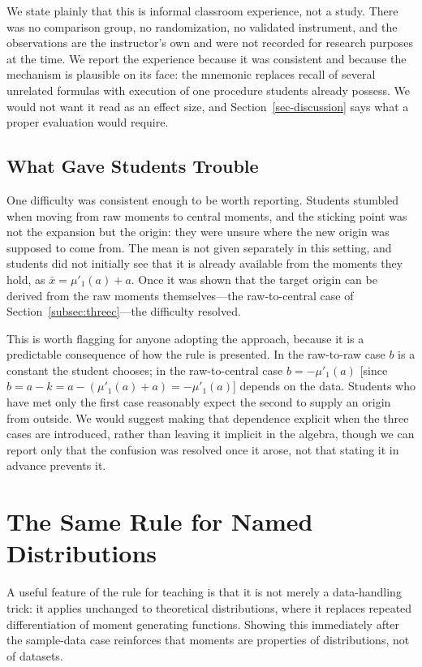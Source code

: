 \documentclass[
  12pt]{article}
\begin{document}
We state plainly that this is informal classroom experience, not a study. There was no comparison group, no randomization, no validated instrument, and the observations are the instructor's own and were not recorded for research purposes at the time. We report the experience because it was consistent and because the mechanism is plausible on its face: the mnemonic replaces recall of several unrelated formulas with execution of one procedure students already possess. We would not want it read as an effect size, and Section~\ref{sec-discussion} says what a proper evaluation would require.

\subsection{What Gave Students Trouble}

One difficulty was consistent enough to be worth reporting. Students stumbled when moving from raw moments to central moments, and the sticking point was not the expansion but the origin: they were unsure where the new origin was supposed to come from. The mean is not given separately in this setting, and students did not initially see that it is already available from the moments they hold, as $\bar{x} = \mu'_1(a) + a$. Once it was shown that the target origin can be derived from the raw moments themselves---the raw-to-central case of Section~\ref{subsec:threec}---the difficulty resolved.

This is worth flagging for anyone adopting the approach, because it is a predictable consequence of how the rule is presented. In the raw-to-raw case $b$ is a constant the student chooses; in the raw-to-central case $b = -\mu'_1(a)$ [since $b = a - k = a - \left(\mu'_1(a) + a\right) = -\mu'_1(a)$] depends on the data. Students who have met only the first case reasonably expect the second to supply an origin from outside. We would suggest making that dependence explicit when the three cases are introduced, rather than leaving it implicit in the algebra, though we can report only that the confusion was resolved once it arose, not that stating it in advance prevents it.

\section{The Same Rule for Named Distributions}\label{sec-dist}

A useful feature of the rule for teaching is that it is not merely a data-handling trick: it applies unchanged to theoretical distributions, where it replaces repeated differentiation of moment generating functions. Showing this immediately after the sample-data case reinforces that moments are properties of distributions, not of datasets.
\end{document}
